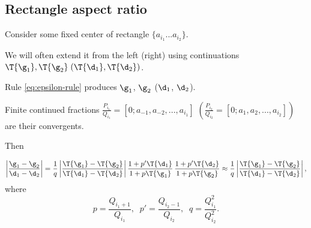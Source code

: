 \subsection{Rectangle aspect ratio}

Consider some fixed center of rectangle $\{a_{i_1} ... a_{i_2}\}$.

We will often extend it from the left (right) using continuations
$\T{\g_1}, \T{\g_2}\; (\T{\d_1}, \T{\d_2})$.

Rule \ref{eq:epsilon-rule} produces $\g_1$, $\g_2$ ($\d_1$, $\d_2$).

Finite continued fractions
$\frac{P_{i_1}}{Q_{i_1}} = [0; a_{-1}, a_{-2}, ..., a_{i_1}]$
$\left(\frac{P_{i_2}}{Q_{i_2}} = [0; a_{1}, a_{2}, ..., a_{i_2}]\right)$
are their convergents.

Then

\begin{equation}\label{eq:aspect-ratio}
	\left| \dfrac{\g_1 - \g_2}{\d_1 - \d_2} \right|
	=
	\dfrac{1}{q}
	\left| \dfrac{\T{\g_1} - \T{\g_2}}
	{\T{\d_1} - \T{\d_2}} \right|
	\dfrac{1 + p' \T{\d_1}}{1 + p \T{\g_1}}\,
	\dfrac{1 + p' \T{\d_2}}{1 + p \T{\g_2}}
	\approx
	\dfrac{1}{q}
	\left| \dfrac{\T{\g_1} - \T{\g_2}}
	{\T{\d_1} - \T{\d_2}} \right|,
\end{equation}
where
\begin{equation*}
	p = \dfrac{Q_{i_1 + 1}}{Q_{i_1}},\;\;
	p' = \dfrac{Q_{i_2 - 1}}{Q_{i_2}},\;\;
	q = \dfrac{Q_{i_1}^2}{Q_{i_2}^2}.
\end{equation*}
